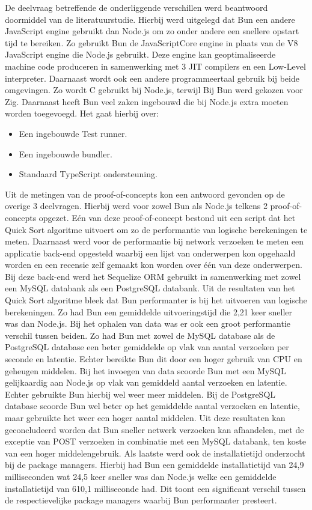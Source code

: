 De deelvraag betreffende de onderliggende verschillen werd beantwoord doormiddel van de literatuurstudie.
Hierbij werd uitgelegd dat Bun een andere JavaScript engine gebruikt dan Node.js om zo onder andere een snellere opstart tijd te bereiken.
Zo gebruikt Bun de JavaScriptCore engine in plaats van de V8 JavaScript engine die Node.js gebruikt.
Deze engine kan geoptimaliseerde machine code produceren in samenwerking met 3 JIT compilers en een Low-Level interpreter.
Daarnaast wordt ook een andere programmeertaal gebruik bij beide omgevingen. Zo wordt C gebruikt bij Node.js, terwijl Bij Bun werd gekozen voor Zig.
Daarnaast heeft Bun veel zaken ingebouwd die bij Node.js extra moeten worden toegevoegd.
Het gaat hierbij over:
\begin{itemize}
    \item Een ingebouwde Test runner.
    \item Een ingebouwde bundler.
    \item Standaard TypeScript ondersteuning.
\end{itemize}
Uit de metingen van de proof-of-concepts kon een antwoord gevonden op de overige 3 deelvragen.
Hierbij werd voor zowel Bun als Node.js telkens 2 proof-of-concepts opgezet. 
Eén van deze proof-of-concept bestond uit een script dat het Quick Sort algoritme uitvoert om zo de performantie van logische berekeningen te meten.
Daarnaast werd voor de performantie bij network verzoeken te meten een applicatie back-end opgesteld waarbij 
een lijst van onderwerpen kon opgehaald worden en een recensie zelf gemaakt kon worden over één van deze onderwerpen.
Bij deze back-end werd het Sequelize ORM gebruikt in samenwerking met zowel een MySQL databank als een PostgreSQL databank.
Uit de resultaten van het Quick Sort algoritme bleek dat Bun performanter is bij het uitvoeren van logische berekeningen.
Zo had Bun een gemiddelde uitvoeringstijd die 2,21 keer sneller was dan Node.js.
Bij het ophalen van data was er ook een groot performantie verschil tussen beiden. Zo had Bun met zowel de MySQL database als de PostgreSQL database 
een beter gemiddelde op vlak van aantal verzoeken per seconde en latentie. Echter bereikte Bun dit door een hoger gebruik van CPU en geheugen middelen.
Bij het invoegen van data scoorde Bun met een MySQL gelijkaardig aan Node.js op vlak van gemiddeld aantal verzoeken en latentie.
Echter gebruikte Bun hierbij wel weer meer middelen. Bij de PostgreSQL database scoorde Bun wel beter op het gemiddelde aantal verzoeken en latentie,
maar gebruikte het weer een hoger aantal middelen.
Uit deze resultaten kan geconcludeerd worden dat Bun sneller netwerk verzoeken kan afhandelen, met de exceptie van POST verzoeken in combinatie met een MySQL databank,
ten koste van een hoger middelengebruik.
Als laatste werd ook de installatietijd onderzocht bij de package managers. Hierbij had Bun een 
gemiddelde installatietijd van 24,9 milliseconden wat 24,5 keer sneller was dan Node.js welke een gemiddelde installatietijd van 610,1 milliseconde had.
Dit toont een significant verschil tussen de respectievelijke package managers waarbij Bun performanter presteert.

